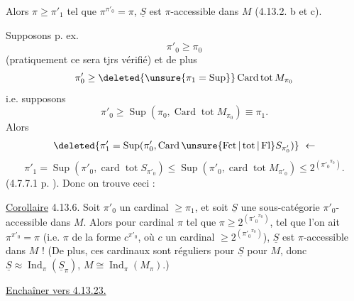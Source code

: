 
Alors  $\pi\geq\pi'_1$ tel que $\pi^{\pi'_0}=\pi$,
$\underline S$ est $\pi$-accessible dans $M$ (4.13.2. b et c).

Supposons p. ex.
\[
\pi'_0\geq\pi_0
\]
(pratiquement ce sera tjrs vérifié) et de plus
\[
\pi'_0\geq\deleted{\unsure{\pi_1=\operatorname{Sup}}}\operatorname{Card}\operatorname{tot}M_{\pi_0}
\]
i.e. supposons
\[
\pi'_0\geq\operatorname{Sup}(\pi_0,\operatorname{Card}\operatorname{tot} M_{\pi_0})\equiv\pi_1.
\]
Alors 
\[
\deleted{\pi'_1=\operatorname{Sup}(\pi'_0,\operatorname{Card}\unsure{\operatorname{Fct}|\operatorname{tot}|\operatorname{Fl}}S_{\pi'_0})}\ \leftarrow
\]
\[
\pi'_1=\operatorname{Sup}(\pi'_0,\operatorname{card}\operatorname{tot}S_{\pi'_0})\leq\operatorname{Sup}(\pi'_0,\operatorname{card}\operatorname{tot}M_{\pi'_0})\leq 2^{({\pi'_0}^{\pi_0})}.
\]
(4.7.7.1 p. ). Donc on trouve ceci :

\uline{Corollaire} 4.13.6. Soit $\pi'_0$ un cardinal $\geq\pi_1$,
et soit $\underline S$ une sous-catégorie $\pi'_0$-accessible
dans $M$. Alors pour  cardinal $\pi$
tel que $\pi\geq 2^{({\pi'_0}^{\pi_0})}$,  tel que l'on
ait $\pi^{\pi'_0}=\pi$ (i.e. $\pi$ de la forme
$c^{\pi'_0}$, où $c$ un cardinal $\geq 2^{({\pi'_0}^{\pi_0})}$),
$\underline S$ est $\pi$-accessible dans $M$ ! (De plus,
ces cardinaux sont réguliers pour $\underline S$ 
pour $M$, donc $\underline S\approx\operatorname{Ind}_{\pi}(\underline S_{\pi})$, $M\cong\operatorname{Ind}_{\pi}(M_\pi)$.)

\uline{Enchaîner vers  4.13.23. }

